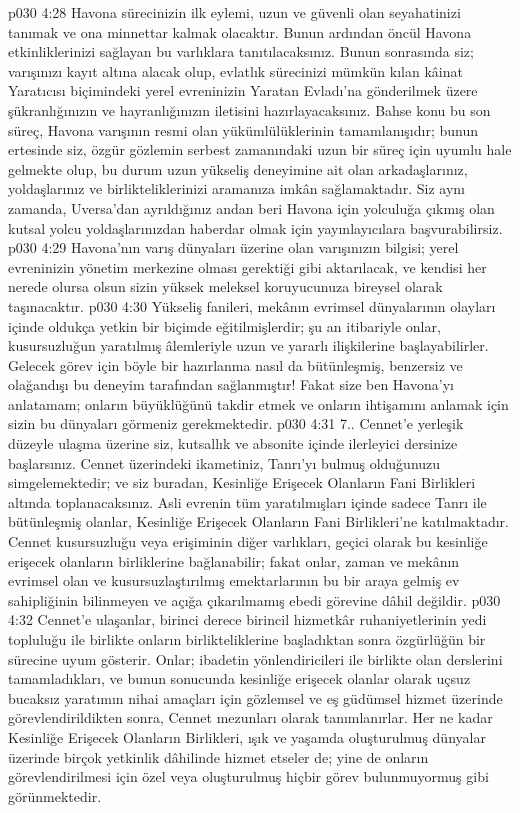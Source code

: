 \vs p030 4:28 Havona sürecinizin ilk eylemi, uzun ve güvenli olan seyahatinizi tanımak ve ona minnettar kalmak olacaktır. Bunun ardından öncül Havona etkinliklerinizi sağlayan bu varlıklara tanıtılacaksınız. Bunun sonrasında siz; varışınızı kayıt altına alacak olup, evlatlık sürecinizi mümkün kılan kâinat Yaratıcısı biçimindeki yerel evreninizin Yaratan Evladı’na gönderilmek üzere şükranlığınızın ve hayranlığınızın iletisini hazırlayacaksınız. Bahse konu bu son süreç, Havona varışının resmi olan yükümlülüklerinin tamamlanışıdır; bunun ertesinde siz, özgür gözlemin serbest zamanındaki uzun bir süreç için uyumlu hale gelmekte olup, bu durum uzun yükseliş deneyimine ait olan arkadaşlarınız, yoldaşlarınız ve birlikteliklerinizi aramanıza imkân sağlamaktadır. Siz aynı zamanda, Uversa’dan ayrıldığınız andan beri Havona için yolculuğa çıkmış olan kutsal yolcu yoldaşlarınızdan haberdar olmak için yayınlayıcılara başvurabilirsiz.
\vs p030 4:29 Havona’nın varış dünyaları üzerine olan varışınızın bilgisi; yerel evreninizin yönetim merkezine olması gerektiği gibi aktarılacak, ve kendisi her nerede olursa olsun sizin yüksek meleksel koruyucunuza bireysel olarak taşınacaktır.
\vs p030 4:30 Yükseliş fanileri, mekânın evrimsel dünyalarının olayları içinde oldukça yetkin bir biçimde eğitilmişlerdir; şu an itibariyle onlar, kusursuzluğun yaratılmış âlemleriyle uzun ve yararlı ilişkilerine başlayabilirler. Gelecek görev için böyle bir hazırlanma nasıl da bütünleşmiş, benzersiz ve olağandışı bu deneyim tarafından sağlanmıştır! Fakat size ben Havona’yı anlatamam; onların büyüklüğünü takdir etmek ve onların ihtişamını anlamak için sizin bu dünyaları görmeniz gerekmektedir.
\vs p030 4:31 7.\bibnobreakspace {}. Cennet’e yerleşik düzeyle ulaşma üzerine siz, kutsallık ve absonite içinde ilerleyici dersinize başlarsınız. Cennet üzerindeki ikametiniz, Tanrı’yı bulmuş olduğunuzu simgelemektedir; ve siz buradan, Kesinliğe Erişecek Olanların Fani Birlikleri altında toplanacaksınız. Asli evrenin tüm yaratılmışları içinde sadece Tanrı ile bütünleşmiş olanlar, Kesinliğe Erişecek Olanların Fani Birlikleri’ne katılmaktadır. Cennet kusursuzluğu veya erişiminin diğer varlıkları, geçici olarak bu kesinliğe erişecek olanların birliklerine bağlanabilir; fakat onlar, zaman ve mekânın evrimsel olan ve kusursuzlaştırılmış emektarlarının bu bir araya gelmiş ev sahipliğinin bilinmeyen ve açığa çıkarılmamış ebedi görevine dâhil değildir.
\vs p030 4:32 Cennet’e ulaşanlar, birinci derece birincil hizmetkâr ruhaniyetlerinin yedi topluluğu ile birlikte onların birlikteliklerine başladıktan sonra özgürlüğün bir sürecine uyum gösterir. Onlar; ibadetin yönlendiricileri ile birlikte olan derslerini tamamladıkları, ve bunun sonucunda kesinliğe erişecek olanlar olarak uçsuz bucaksız yaratımın nihai amaçları için gözlemsel ve eş güdümsel hizmet üzerinde görevlendirildikten sonra, Cennet mezunları olarak tanımlanırlar. Her ne kadar Kesinliğe Erişecek Olanların Birlikleri, ışık ve yaşamda oluşturulmuş dünyalar üzerinde birçok yetkinlik dâhilinde hizmet etseler de; yine de onların görevlendirilmesi için özel veya oluşturulmuş hiçbir görev bulunmuyormuş gibi görünmektedir.
